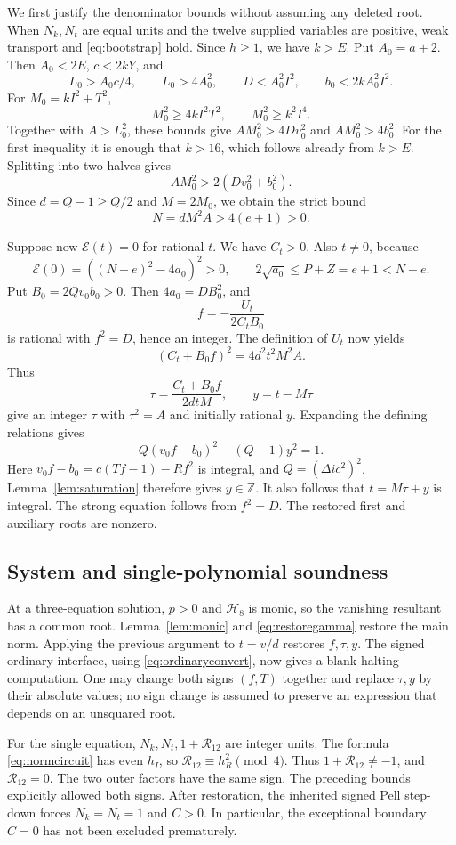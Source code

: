 \documentclass[11pt,letterpaper]{article}
\theoremstyle{remark}\newtheorem{remark}[theorem]{Remark}
\newcommand{\Z}{\mathbb Z}\newcommand{\N}{\mathbb N}\newcommand{\pos}{\mathbb Z_{>0}}
\begin{document}
We first justify the denominator bounds without assuming any deleted root.
When $N_k,N_t$ are equal units and the twelve supplied variables are positive,
weak transport and \eqref{eq:bootstrap} hold. Since $h\geq1$, we have $k>E$.
Put $A_0=a+2$. Then $A_0<2E$, $c<2kY$, and
\[
 L_0>A_0c/4,\qquad L_0>4A_0^2,\qquad
 D<A_0^2I^2,\qquad b_0<2kA_0^2I^2.
\]
For $M_0=kI^2+T^2$,
\[
 M_0^2\geq4kI^2T^2,\qquad M_0^2\geq k^2I^4.
\]
Together with $A>L_0^2$, these bounds give
$AM_0^2>4Dv_0^2$ and $AM_0^2>4b_0^2$. For the first inequality it is enough
that $k>16$, which follows already from $k>E$. Splitting into two halves gives
\[
 AM_0^2>2(Dv_0^2+b_0^2).
\]
Since $d=Q-1\geq Q/2$ and $M=2M_0$, we obtain the strict bound
\begin{equation}\label{eq:domination}
 N=dM^2A>4(e+1)>0.
\end{equation}

Suppose now $\mathcal E(t)=0$ for rational $t$. We have $C_t>0$. Also $t\ne0$,
because
\[
 \mathcal E(0)=((N-e)^2-4a_0)^2>0,
 \qquad 2\sqrt{a_0}\leq P+Z=e+1<N-e.
\]
Put $B_0=2Qv_0b_0>0$. Then $4a_0=DB_0^2$, and
\[
 f=-\frac{U_t}{2C_tB_0}
\]
is rational with $f^2=D$, hence an integer. The definition of $U_t$ now yields
\[
 (C_t+B_0f)^2=4d^2t^2M^2A.
\]
Thus
\[
 \tau=\frac{C_t+B_0f}{2dtM},\qquad y=t-M\tau
\]
give an integer $\tau$ with $\tau^2=A$ and initially rational $y$. Expanding
the defining relations gives
\[
 Q(v_0f-b_0)^2-(Q-1)y^2=1.
\]
Here $v_0f-b_0=c(Tf-1)-Rf^2$ is integral, and
$Q=(\Delta i c^2)^2$. Lemma~\ref{lem:saturation} therefore gives $y\in\Z$.
It also follows that $t=M\tau+y$ is integral. The strong equation follows
from $f^2=D$. The restored first and auxiliary roots are nonzero.

\subsection{System and single-polynomial soundness}
At a three-equation solution, $p>0$ and $\mathcal H_8$ is monic, so the
vanishing resultant has a common root. Lemma~\ref{lem:monic} and
\eqref{eq:restoregamma} restore the main norm. Applying the previous argument
to $t=v/d$ restores $f,\tau,y$. The signed ordinary interface, using
\eqref{eq:ordinaryconvert}, now gives a blank halting computation.
One may change both signs $(f,T)$ together and replace $\tau,y$ by their
absolute values; no sign change is assumed to preserve an expression that
depends on an unsquared root.

For the single equation, $N_k,N_t,1+\mathcal R_{12}$ are integer units.
The formula \eqref{eq:normcircuit} has even $h_I$, so
$\mathcal R_{12}\equiv h_R^2\pmod4$. Thus $1+\mathcal R_{12}\ne-1$,
and $\mathcal R_{12}=0$. The two outer factors have the same sign. The
preceding bounds explicitly allowed both signs. After restoration, the
inherited signed Pell step-down forces $N_k=N_t=1$ and $C>0$.
In particular, the exceptional boundary $C=0$ has not been excluded
prematurely.
\end{document}
